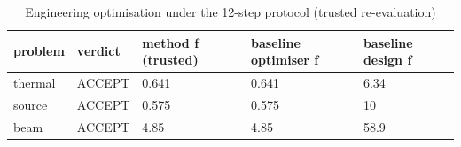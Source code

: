 \begin{table}[t]\centering\small\caption{Engineering optimisation under the 12-step protocol (trusted re-evaluation)}\label{tab:phase5}
\begin{tabular}{lllll}\toprule
problem & verdict & method f (trusted) & baseline optimiser f & baseline design f \\ \midrule
thermal & ACCEPT & 0.641 & 0.641 & 6.34 \\
source & ACCEPT & 0.575 & 0.575 & 10 \\
beam & ACCEPT & 4.85 & 4.85 & 58.9 \\
\bottomrule\end{tabular}\end{table}
